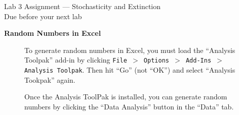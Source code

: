 \documentclass[12pt]{article}\usepackage[]{graphicx}\usepackage[]{color}
\begin{document}
{
  \Large
  \centering
  Lab 3 Assignment --- Stochasticity and Extinction \\
  Due before your next lab \par
}

{\bf Random Numbers in Excel \\}


\begin{figure}[h]
  \centering
  \caption{To generate random numbers in Excel, you must load the
    ``Analysis Toolpak'' add-in by clicking
    {\tt File $>$ Options $>$ Add-Ins $>$ Analysis Toolpak}. Then hit
    ``Go'' (not ``OK'') and select ``Analysis Tookpak'' again.}
  \label{fig:rng}
\end{figure}

\clearpage

\begin{figure}[h]
  \centering
  \caption{\footnotesize Once the Analysis ToolPak is installed, you can generate
    random numbers by clicking the ``Data Analysis'' button in the
    ``Data'' tab.}
  \label{fig:rng-2}
\end{figure}
\end{document}
